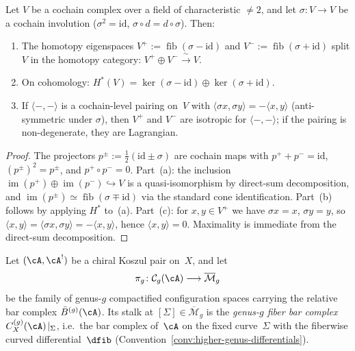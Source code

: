 \begin{lemma}
\label{lem:involution-splitting}
Let $V$ be a cochain complex over a field of characteristic $\neq 2$,
and let $\sigma \colon V \to V$ be a cochain involution
($\sigma^2 = \mathrm{id}$, $\sigma \circ d = d \circ \sigma$).  Then:
\begin{enumerate}[label=\textup{(\alph*)}]
\item The homotopy eigenspaces
  $V^+ := \operatorname{fib}(\sigma - \mathrm{id})$ and
  $V^- := \operatorname{fib}(\sigma + \mathrm{id})$
  split $V$ in the homotopy category:
  $V^+ \oplus V^- \xrightarrow{\;\sim\;} V$.
\item On cohomology:
  $H^*(V) = \ker(\sigma - \mathrm{id}) \oplus \ker(\sigma + \mathrm{id})$.
\item If $\langle -,- \rangle$ is a cochain-level pairing on~$V$
  with $\langle \sigma x, \sigma y \rangle = -\langle x, y \rangle$
  \textup{(}anti-symmetric under $\sigma$\textup{)}, then $V^+$ and
  $V^-$ are isotropic for $\langle -,- \rangle$; if the pairing is
  non-degenerate, they are Lagrangian.
\end{enumerate}
\end{lemma}

\begin{proof}
The projectors $p^\pm := \tfrac{1}{2}(\mathrm{id} \pm \sigma)$
are cochain maps with $p^+ + p^- = \mathrm{id}$,
$(p^\pm)^2 = p^\pm$, and $p^+ \circ p^- = 0$.
Part~(a): the inclusion $\operatorname{im}(p^+) \oplus \operatorname{im}(p^-)
\hookrightarrow V$ is a quasi-isomorphism by direct-sum decomposition,
and $\operatorname{im}(p^\pm) \simeq \operatorname{fib}(\sigma \mp \mathrm{id})$
via the standard cone identification.
Part~(b) follows by applying $H^*$ to~(a).
Part~(c): for $x, y \in V^+$ we have $\sigma x = x$, $\sigma y = y$,
so $\langle x, y \rangle = \langle \sigma x, \sigma y \rangle
= -\langle x, y \rangle$, hence $\langle x, y \rangle = 0$.
Maximality is immediate from the direct-sum decomposition.
\end{proof}

\begin{definition}\label{def:relative-bar-fiber}
Let $(\cA, \cA^!)$ be a chiral Koszul pair on~$X$, and let
\[
\pi_g\colon \mathcal{C}_g(\cA) \longrightarrow
\overline{\mathcal{M}}_g
\]
be the family of genus-$g$ compactified configuration spaces
carrying the relative bar complex $\bar{B}^{(g)}(\cA)$.
Its stalk at $[\Sigma] \in \overline{\mathcal{M}}_g$ is the
\emph{genus-$g$ fiber bar complex}
$C^{(g)}_X(\cA)\!\mid_\Sigma$, i.e.\ the bar complex of~$\cA$
on the fixed curve~$\Sigma$ with the fiberwise curved
differential~$\dfib$
\textup{(}Convention~\textup{\ref{conv:higher-genus-differentials})}.
\end{definition}

